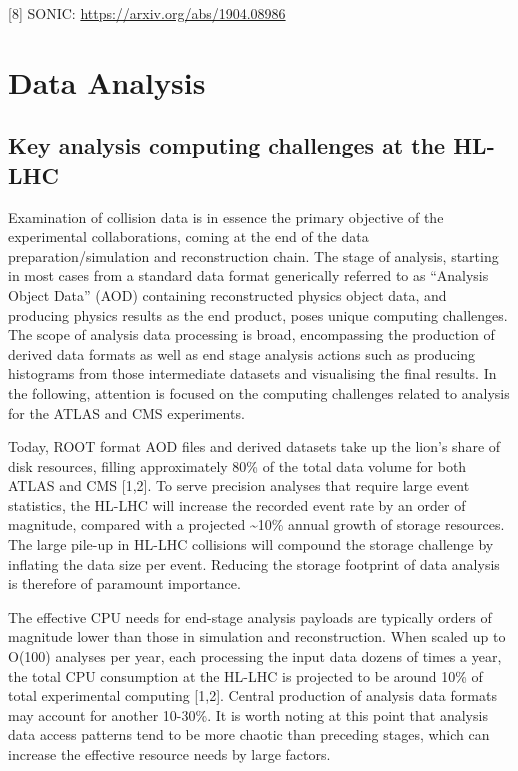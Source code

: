 \documentclass[10pt,a4paper]{article}
\begin{document}
{[}8{]} SONIC:
\href{https://arxiv.org/abs/1904.08986}{{https://arxiv.org/abs/1904.08986}}

\hypertarget{data-analysis}{%
\section{Data Analysis}\label{data-analysis}}

\hypertarget{key-analysis-computing-challenges-at-the-hl-lhc}{%
\subsection{Key analysis computing challenges at the
HL-LHC}\label{key-analysis-computing-challenges-at-the-hl-lhc}}

Examination of collision data is in essence the primary objective of the
experimental collaborations, coming at the end of the data
preparation/simulation and reconstruction chain. The stage of analysis,
starting in most cases from a standard data format generically referred
to as ``Analysis Object Data'' (AOD) containing reconstructed physics
object data, and producing physics results as the end product, poses
unique computing challenges. The scope of analysis data processing is
broad, encompassing the production of derived data formats as well as
end stage analysis actions such as producing histograms from those
intermediate datasets and visualising the final results. In the
following, attention is focused on the computing challenges related to
analysis for the ATLAS and CMS experiments.

Today, ROOT format AOD files and derived datasets take up the lion's
share of disk resources, filling approximately 80\% of the total data
volume for both ATLAS and CMS {[}1,2{]}. To serve precision analyses
that require large event statistics, the HL-LHC will increase the
recorded event rate by an order of magnitude, compared with a projected
\textasciitilde 10\% annual growth of storage resources. The large pile-up in HL-LHC
collisions will compound the storage challenge by inflating the data
size per event. Reducing the storage footprint of data analysis is
therefore of paramount importance.

The effective CPU needs for end-stage analysis payloads are typically
orders of magnitude lower than those in simulation and reconstruction.
When scaled up to O(100) analyses per year, each processing the input
data dozens of times a year, the total CPU consumption at the HL-LHC is
projected to be around 10\% of total experimental computing {[}1,2{]}.
Central production of analysis data formats may account for another
10-30\%. It is worth noting at this point that analysis data access
patterns tend to be more chaotic than preceding stages, which can
increase the effective resource needs by large factors.
\end{document}
